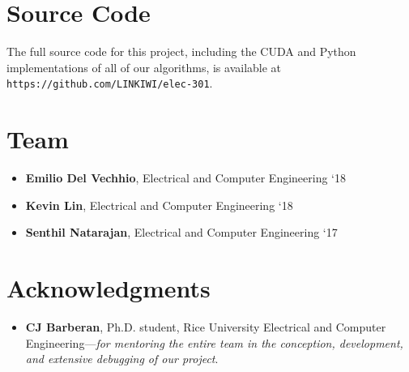 \documentclass[journal]{IEEEtran}
\begin{document}
\section*{Source Code}
The full source code for this project, including the CUDA and Python implementations of all of our algorithms, is available at \texttt{https://github.com/LINKIWI/elec-301}.

\section*{Team}
\begin{itemize}
	\item \textbf{Emilio Del Vechhio}, Electrical and Computer Engineering `18
	\item \textbf{Kevin Lin}, Electrical and Computer Engineering `18
	\item \textbf{Senthil Natarajan}, Electrical and Computer Engineering `17
\end{itemize}

\section*{Acknowledgments}
\begin{itemize}
	\item \textbf{CJ Barberan}, Ph.D. student, Rice University Electrical and Computer Engineering---\textit{for mentoring the entire team in the conception, development, and extensive debugging of our project}.
\end{itemize}
\end{document}
